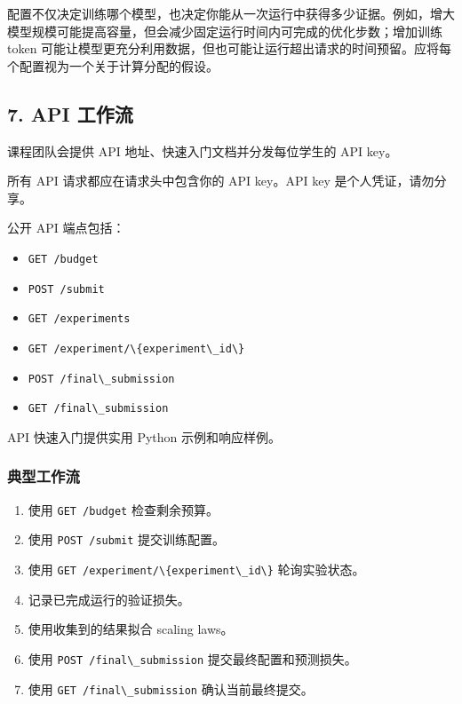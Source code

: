 \documentclass[
  11pt,
]{ctexart}
\newcommand{\passthrough}[1]{#1}
\providecommand{\tightlist}{%
  \setlength{\itemsep}{0pt}\setlength{\parskip}{0pt}}
\begin{document}
配置不仅决定训练哪个模型，也决定你能从一次运行中获得多少证据。例如，增大模型规模可能提高容量，但会减少固定运行时间内可完成的优化步数；增加训练
token
可能让模型更充分利用数据，但也可能让运行超出请求的时间预留。应将每个配置视为一个关于计算分配的假设。

\hypertarget{api-ux5de5ux4f5cux6d41}{%
\subsection{7. API 工作流}\label{api-ux5de5ux4f5cux6d41}}

课程团队会提供 API 地址、快速入门文档并分发每位学生的 API key。

所有 API 请求都应在请求头中包含你的 API key。API key
是个人凭证，请勿分享。

公开 API 端点包括：

\begin{itemize}
\tightlist
\item
  \passthrough{\lstinline!GET /budget!}
\item
  \passthrough{\lstinline!POST /submit!}
\item
  \passthrough{\lstinline!GET /experiments!}
\item
  \passthrough{\lstinline!GET /experiment/\{experiment\_id\}!}
\item
  \passthrough{\lstinline!POST /final\_submission!}
\item
  \passthrough{\lstinline!GET /final\_submission!}
\end{itemize}

API 快速入门提供实用 Python 示例和响应样例。

\hypertarget{ux5178ux578bux5de5ux4f5cux6d41}{%
\subsubsection{典型工作流}\label{ux5178ux578bux5de5ux4f5cux6d41}}

\begin{enumerate}
\def\labelenumi{\arabic{enumi}.}
\tightlist
\item
  使用 \passthrough{\lstinline!GET /budget!} 检查剩余预算。
\item
  使用 \passthrough{\lstinline!POST /submit!} 提交训练配置。
\item
  使用 \passthrough{\lstinline!GET /experiment/\{experiment\_id\}!}
  轮询实验状态。
\item
  记录已完成运行的验证损失。
\item
  使用收集到的结果拟合 scaling laws。
\item
  使用 \passthrough{\lstinline!POST /final\_submission!}
  提交最终配置和预测损失。
\item
  使用 \passthrough{\lstinline!GET /final\_submission!}
  确认当前最终提交。
\end{enumerate}
\end{document}
